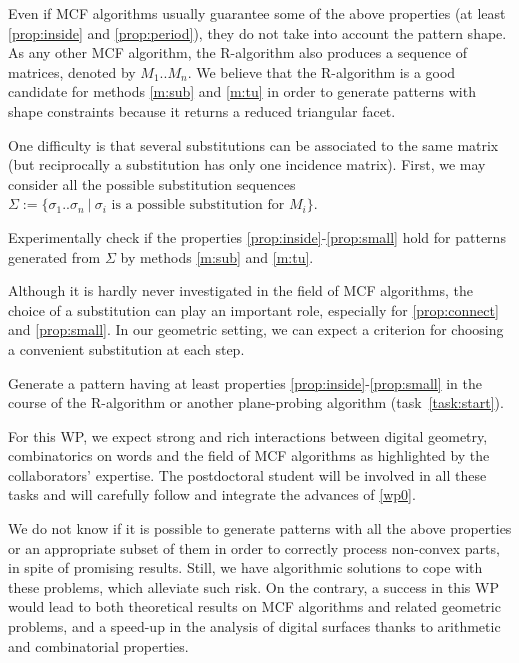 Even if MCF algorithms usually guarantee some of the above properties
(at least \ref{prop:inside} and \ref{prop:period}),
they do not take into account the pattern shape. As any other MCF algorithm, the R-algorithm
also produces a sequence of matrices, denoted by $M_1..M_n$. We believe that the R-algorithm
is a good candidate for methods \ref{m:sub} and \ref{m:tu} in order to generate patterns with shape
constraints because it returns a reduced triangular facet.

One difficulty is that several substitutions can be associated to the same matrix
(but reciprocally a substitution has only one incidence matrix). First, we may consider all the possible
substitution sequences
$\Sigma := \{ \sigma_1..\sigma_n \ | \ \sigma_i \text{ is a possible substitution for } M_i \}$.

\begin{Task}
  \label{task:genexp}
  Experimentally check if the properties \ref{prop:inside}-\ref{prop:small}
  hold for patterns generated from $\Sigma$ by methods \ref{m:sub} and \ref{m:tu}.  
\end{Task}

Although it is hardly never investigated in the field of MCF algorithms, the choice of a
substitution can play an important role, especially for \ref{prop:connect} and \ref{prop:small}.
In our geometric setting, we can expect a criterion for choosing a convenient substitution at each step. 

\begin{Task}
  \label{task:genpat}
  Generate a pattern having at least properties \ref{prop:inside}-\ref{prop:small} in the course of
  the R-algorithm or another plane-probing algorithm (task~\ref{task:start}). 
\end{Task}

For this WP, we expect strong and rich interactions between digital geometry, combinatorics on words
and the field of MCF algorithms as highlighted by the collaborators' expertise. The postdoctoral
student will be involved in all these tasks and will carefully follow and integrate the advances
of \ref{wp0}.


\Risks
We do not know if it is possible to generate patterns with all the above properties
or an appropriate subset of them in order to correctly process non-convex parts,
in spite of promising results. Still, we have algorithmic solutions
\cite{LPRJMIV2017} to cope with these problems, which alleviate such risk. 
On the contrary, a success in this WP would lead to both theoretical results
on MCF algorithms and related geometric problems, and a speed-up in the analysis
of digital surfaces thanks to arithmetic and combinatorial properties.  

